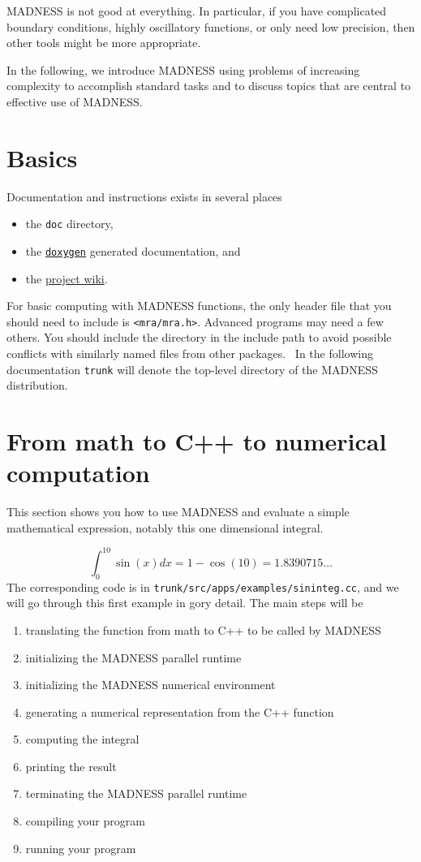 \documentclass[letterpaper]{article}
\newcommand\liststyleLii{%
\renewcommand\labelitemi{{\textbullet}}
\renewcommand\labelitemii{${\circ}$}
\renewcommand\labelitemiii{${\blacksquare}$}
\renewcommand\labelitemiv{{\textbullet}}
}
\newcommand\liststyleLiii{%
\renewcommand\theenumi{\arabic{enumi}}
\renewcommand\theenumii{\arabic{enumii}}
\renewcommand\theenumiii{\arabic{enumiii}}
\renewcommand\theenumiv{\arabic{enumiv}}
\renewcommand\labelenumi{\theenumi.}
\renewcommand\labelenumii{\theenumii.}
\renewcommand\labelenumiii{\theenumiii.}
\renewcommand\labelenumiv{\theenumiv.}
}
\begin{document}
MADNESS is not good at everything. In particular, if you have complicated boundary conditions, highly oscillatory
functions, or only need low precision, then other tools might be more appropriate.

In the following, we introduce MADNESS using problems of increasing complexity to accomplish standard tasks and to
discuss topics that are central to effective use of MADNESS.

\section{Basics}
Documentation and instructions exists in several places

\liststyleLii
\begin{itemize}
\item the \texttt{doc} directory,
\item the \href{http://www.doxygen.org/}{\texttt{doxygen}} generated documentation, and
\item the \href{http://code.google.com/p/m-a-d-n-e-s-s/}{project wiki}.
\end{itemize}
For basic computing with MADNESS functions, the only header file that you should need to include is
\texttt{{\textless}mra/mra.h{\textgreater}}. Advanced programs may need a few others. You should include the directory
in the include path to avoid possible conflicts with similarly named files from other packages. \ In the following
documentation \texttt{trunk} will denote the top-level directory of the MADNESS distribution.

\section{From math to C++ to numerical computation}
This section shows you how to use MADNESS and evaluate a simple mathematical expression, notably this one dimensional
integral.

\begin{equation}
\int _{0}^{10}\sin (x)\mathit{dx}=1-\cos (10)=1.8390715\ldots 
\end{equation}
The corresponding code is in \texttt{trunk/src/apps/examples/sininteg.cc}, and we will go through this first example in
gory detail. The main steps will be

\liststyleLiii
\begin{enumerate}
\item translating the function from math to C++ to be called by MADNESS
\item initializing the MADNESS parallel runtime
\item initializing the MADNESS numerical environment
\item generating a numerical representation from the C++ function
\item computing the integral
\item printing the result
\item terminating the MADNESS parallel runtime
\item compiling your program
\item running your program
\end{enumerate}
\end{document}
